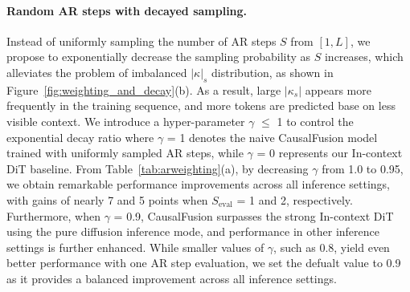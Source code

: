 \vspace{-5pt}
\paragraph{Random AR steps with decayed sampling.} 
Instead of uniformly sampling the number of AR steps $S$ from $[1, L]$, we propose to exponentially decrease the sampling probability as $S$ increases, which alleviates the problem of imbalanced $|\kappa|_s$ distribution, as shown in Figure~\ref{fig:weighting_and_decay}(b).
As a result, large $|\kappa_s|$ appears more frequently in the training sequence, and more tokens are predicted base on less visible context. We introduce a hyper-parameter $\gamma$ $\leq$ 1 to control the exponential decay ratio where $\gamma$ = 1 denotes the naive CausalFusion model trained with uniformly sampled AR steps, while $\gamma$ = 0 represents our In-context DiT baseline.
From Table~\ref{tab:arweighting}(a), by decreasing $\gamma$ from 1.0 to 0.95, we obtain remarkable performance improvements across all inference settings, with gains of nearly 7 and 5 points when $S_\text{eval}$ = 1 and 2, respectively. Furthermore, when $\gamma$ = 0.9, CausalFusion surpasses the strong In-context DiT using the pure diffusion inference mode, and performance in other inference settings is further enhanced. While smaller values of $\gamma$, such as 0.8, yield even better performance with one AR step evaluation, we set the defualt value to 0.9 as it provides a balanced improvement across all inference settings.


